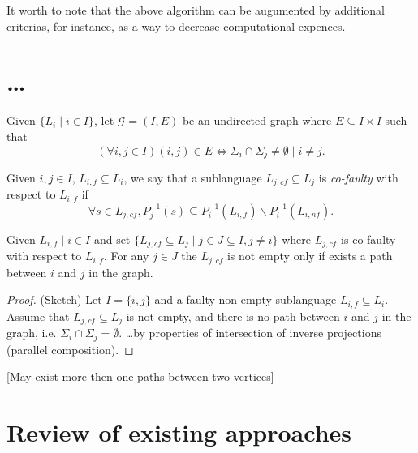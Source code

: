 \documentclass[a4paper, 10pt, conference]{ieeeconf}
\begin{document}
It worth to note that the above algorithm can be augumented by additional
criterias, for instance, as a way to decrease computational expences.


\section{\ldots}

\begin{definition}
\label{def:graph}
Given $\{L_i \mid i \in I \}$, let $\mathcal{G} = (I, E)$ be an undirected
graph where $E \subseteq I \times I$ such that
$$(\forall i, j \in I)(i, j) \in E \Leftrightarrow 
	\Sigma_i \cap \Sigma_j \neq \emptyset \mid i \neq j.$$
\end{definition}


 \begin{definition}
\label{def:co-faulty}
Given $i, j \in I$, $L_{i,f} \subseteq L_i$,
we say that a sublanguage $L_{j,cf} \subseteq L_j$ is \emph{co-faulty} with
respect to $L_{i,f}$ if 
$$\forall s \in L_{j,cf}, P_j^{-1}(s) \subseteq 
	P_i^{-1}(L_{i,f}) \backslash P_i^{-1}(L_{i,nf}).$$
\end{definition}


\begin{lemma}
\label{lem:co-faulty-if-path}
Given $L_{i,f} \mid i \in I$ and set $\{L_{j,cf} \subseteq L_j \mid j \in J
\subseteq I, j \neq i\}$ where $L_{j,cf}$ is co-faulty with respect to $L_{i,f}$. 
For any $j \in J$ the $L_{j,cf}$ is not empty only if exists a path between $i$
and $j$ in the graph.
\end{lemma}

\begin{proof}(Sketch) 
Let $I = \{i, j\}$ and a faulty non empty sublanguage
$L_{i,f} \subseteq L_i$. Assume that $L_{j,cf} \subseteq L_j$ is not
empty, and there is no path between $i$ and $j$ in the graph, i.e.
$\Sigma_i \cap \Sigma_j = \emptyset$. \ldots by properties of intersection of
inverse projections (parallel composition).
\end{proof}

[May exist more then one paths between two vertices]  

\section{Review of existing approaches}
\end{document}
